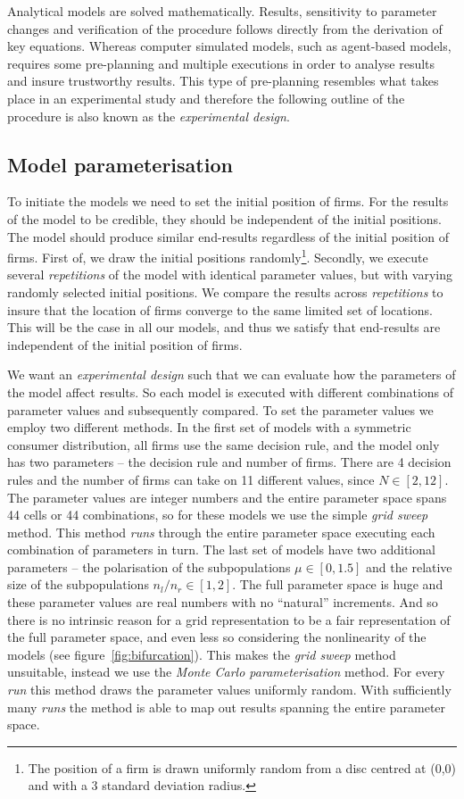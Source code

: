 \documentclass[preprint, 12pt]{elsarticle}
\begin{document}
Analytical models are solved mathematically. Results, sensitivity to parameter changes and verification of the procedure follows directly from the derivation of key equations. Whereas computer simulated models, such as agent-based models, requires some pre-planning and multiple executions in order to analyse results and insure trustworthy results. This type of pre-planning resembles what takes place in an experimental study and therefore the following outline of the procedure is also known as the \emph{experimental design}.

\subsection{Model parameterisation}

To initiate the models we need to set the initial position of firms. For the results of the model to be credible, they should be independent of the initial positions. The model should produce similar end-results regardless of the initial position of firms. First of, we draw the initial positions randomly\footnote{The position of a firm is drawn uniformly random from a disc centred at (0,0) and with a 3 standard deviation radius.}. Secondly, we execute several \emph{repetitions} of the model with identical parameter values, but with varying randomly selected initial positions. We compare the results across \emph{repetitions} to insure that the location of firms converge to the same limited set of locations. This will be the case in all our models, and thus we satisfy that end-results are independent of the initial position of firms.

We want an \emph{experimental design} such that we can evaluate how the parameters of the model affect results. So each model is executed with different combinations of parameter values and subsequently compared. To set the parameter values we employ two different methods. In the first set of models with a symmetric consumer distribution, all firms use the same decision rule, and the model only has two parameters -- the decision rule and number of firms. There are 4 decision rules and the number of firms can take on 11 different values, since $N \in [2, 12]$. The parameter values are integer numbers and the entire parameter space spans 44 cells or 44 combinations, so for these models we use the simple \emph{grid sweep} method. This method \emph{runs} through the entire parameter space executing each combination of parameters in turn. The last set of models have two additional parameters -- the polarisation of the subpopulations $\mu \in [0, 1.5]$ and the relative size of the subpopulations $n_l/n_r \in [1, 2]$. The full parameter space is huge and these parameter values are real numbers with no ``natural'' increments. And so there is no intrinsic reason for a grid representation to be a fair representation of the full parameter space, and even less so considering the nonlinearity of the models (see figure~\ref{fig:bifurcation}). This makes the \emph{grid sweep} method unsuitable, instead we use the \emph{Monte Carlo parameterisation} method. For every \emph{run} this method draws the parameter values uniformly random. With sufficiently many \emph{runs} the method is able to map out results spanning the entire parameter space.
\end{document}
